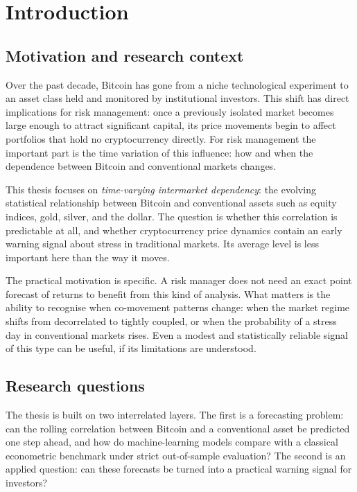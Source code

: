 \section{Introduction}

\subsection{Motivation and research context}

Over the past decade, Bitcoin has gone from a niche technological experiment to an asset class held and monitored by institutional investors. This shift has direct implications for risk management: once a previously isolated market becomes large enough to attract significant capital, its price movements begin to affect portfolios that hold no cryptocurrency directly. For risk management the important part is the time variation of this influence: how and when the dependence between Bitcoin and conventional markets changes.

This thesis focuses on \emph{time-varying intermarket dependency}: the evolving statistical relationship between Bitcoin and conventional assets such as equity indices, gold, silver, and the dollar. The question is whether this correlation is predictable at all, and whether cryptocurrency price dynamics contain an early warning signal about stress in traditional markets. Its average level is less important here than the way it moves.

The practical motivation is specific. A risk manager does not need an exact point forecast of returns to benefit from this kind of analysis. What matters is the ability to recognise when co-movement patterns change: when the market regime shifts from decorrelated to tightly coupled, or when the probability of a stress day in conventional markets rises. Even a modest and statistically reliable signal of this type can be useful, if its limitations are understood.

\subsection{Research questions}

The thesis is built on two interrelated layers. The first is a forecasting problem: can the rolling correlation between Bitcoin and a conventional asset be predicted one step ahead, and how do machine-learning models compare with a classical econometric benchmark under strict out-of-sample evaluation? The second is an applied question: can these forecasts be turned into a practical warning signal for investors?

